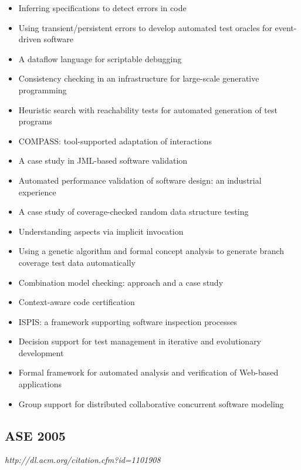 {\begin{itemize}[itemsep=-1ex]
  \item Inferring specifications to detect errors in code
  \item Using transient/persistent errors to develop automated test oracles for event-driven software
  \item A dataflow language for scriptable debugging
  \item Consistency checking in an infrastructure for large-scale generative programming
  \item Heuristic search with reachability tests for automated generation of test programs
  \item COMPASS: tool-supported adaptation of interactions
  \item A case study in JML-based software validation
  \item Automated performance validation of software design: an industrial experience
  \item A case study of coverage-checked random data structure testing
  \item Understanding aspects via implicit invocation
  \item Using a genetic algorithm and formal concept analysis to generate branch coverage test data automatically
  \item Combination model checking: approach and a case study
  \item Context-aware code certification
  \item ISPIS: a framework supporting software inspection processes
  \item Decision support for test management in iterative and evolutionary development
  \item Formal framework for automated analysis and verification of Web-based applications 
  \item Group support for distributed collaborative concurrent software modeling
\end{itemize}
}

\subsection{ASE 2005}

{\small \em http://dl.acm.org/citation.cfm?id=1101908}

